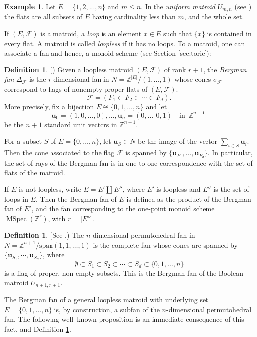 \documentclass[12pt]{amsart}
\def\cF{\mathcal F}
\newcommand{\Z}{\mathbb{Z}}
\newcommand{\bu}{\mathbf{u}}
\def\MSpec{\operatorname{MSpec}}
\numberwithin{equation}{section}
\theoremstyle{plain}
\theoremstyle{definition}
\newtheorem{defn}[equation]{Definition}
\newtheorem{ex}[equation]{Example}
\theoremstyle{remark}
\begin{document}
\begin{ex}\label{ex:uniform} 
Let $E=\{1,2,...,n\}$ and $m\le n$. In the 
{\it uniform matroid} $U_{m,n}$ (see \cite[1.2.7]{Ox})
the flats are all subsets of $E$ having cardinality
less than $m$, and the whole set.
\end{ex}

If $(E,\cF)$ is a matroid, a {\em loop} is an element $x\in E$ such that $\{x\}$ is contained in every flat. A matroid is called {\em loopless} if it has no loops. To a matroid, one can associate a fan and hence, a monoid scheme (see Section \ref{sec:toric}):

\begin{defn}\label{Bergman}  (\cite[3.10]{Huh})
	Given a loopless matroid $(E,\cF)$ of rank $r+1$, 
	the {\it Bergman fan} $\Delta_{\cF}$
	is the $r$-dimensional fan in $N=\Z^{|E|}/(1,...,1)$ whose cones
	$\sigma_{\cF}$ correspond to
	flags of nonempty proper flats of $(E,\cF)$.
	\[
	\cF = (F_1 \subset F_2 \subset \cdots \subset F_d).
	\]
	More precisely, fix a bijection $E \cong \{0,1,\dotsc, n\}$ and let 
	\[
	\bu_0=(1,0,\dots,0),...,\bu_n=(0,\dots,0,1)\quad \text{in~}\, \Z^{n+1}.
	\]
	be the $n+1$ standard unit vectors in $\Z^{n+1}.$
	
	For a subset $S$ of $E = \{0,\dotsc, n\}$, let $\bu_S\in N$ be the
	image of the vector $\sum_{i\in S} \bu_i$. Then the cone associated to
	the flag $\cF$ is spanned by $\{\bu_{F_1},\dotsc, \bu_{F_d}\}.$ In
	particular, the set of rays of the Bergman fan is in one-to-one
	correspondence with the set of flats of the matroid.
	
	If $E$ is not loopless,  write $E=E'\amalg E''$,
	where $E'$ is loopless and $E''$ is the set of loops in $E$.
	Then the Bergman fan of $E$ is defined as the product of the
	Bergman fan of $E'$, and the fan corresponding to the
	one-point monoid scheme $\MSpec(\Z^r)$, with $r=|E'']$.
\end{defn}

\begin{defn}\label{defn:permutahedron}
	(See \cite[3.2]{Huh}.)
	The $n$-dimensional permutohedral fan in
	$N=\Z^{n+1}/\text{span}(1,1,\dots,1)$ is the complete fan
	whose cones are spanned by $\{\bu_{S_1}, \cdots, \bu_{S_d}\}$,
	where 
	\[\emptyset\subset S_1\subset S_2 \subset \dotsm \subset S_d\subset \{0,1,\dotsc, n\}\]
	 is a flag of proper, non-empty subsets. 
This is the Bergman fan of the Boolean matroid $U_{n+1,n+1}$.
\end{defn}  


The Bergman fan of a general loopless matroid with
underlying set $E = \{0,1,\dotsc, n\}$ is, by construction,
a subfan of the $n$-dimensional permutohedral fan. 
The following well--known proposition is an immediate consequence
of this fact, and Definition \ref{defn:permutahedron}. 
\end{document}
